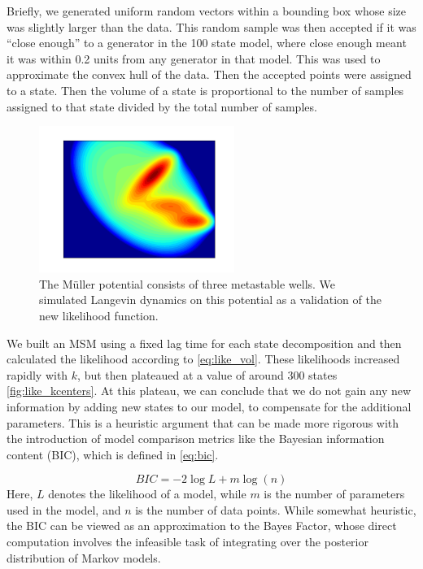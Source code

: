 \documentclass[twocolumn,floatfix,nofootinbib,aps]{revtex4-1}
\begin{document}
Briefly, we generated uniform random vectors within a bounding box whose size was slightly larger than the data. This random sample was then accepted if it was ``close enough'' to a generator in the 100 state model, where close enough meant it was within 0.2 units from any generator in that model. This was used to approximate the convex hull of the data. Then the accepted points were assigned to a state. Then the volume of a state is proportional to the number of samples assigned to that state divided by the total number of samples. %
\begin{figure}[h!]
\includegraphics[width=2.5in]{figs/muller_pot.png}
\caption{The M\"{u}ller potential consists of three metastable wells. We simulated Langevin dynamics on this potential as a validation of the new likelihood function.}
\label{fig:muller_pot}
\end{figure} 

We built an MSM using a fixed lag time for each state decomposition and then calculated the likelihood according to \cref{eq:like_vol}. These likelihoods increased rapidly with $k$, but then plateaued at a value of around 300 states \cref{fig:like_kcenters}. At this plateau, we can conclude that we do not gain any new information by adding new states to our model, to compensate for the additional parameters. This is a heuristic argument that can be made more rigorous with the introduction of model comparison metrics like the Bayesian information content (BIC), which is defined in \cref{eq:bic}.

\begin{equation}
BIC = -2 \log L + m \log(n) 
\label{eq:bic}
\end{equation} Here, $L$ denotes the likelihood of a model, while $m$ is the number of parameters used in the model, and $n$ is the number of data points. While somewhat heuristic, the BIC can be viewed as an approximation to the Bayes Factor, whose direct computation involves the infeasible task of integrating over the posterior distribution of Markov models.
\end{document}
